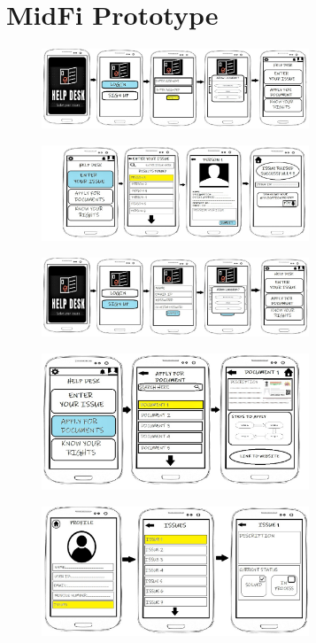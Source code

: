 \documentclass[acmtog]{acmart}
\begin{document}
\section{MidFi Prototype}
\begin{figure}[H]
    \includegraphics[width=8cm]{Prototype/Low-fi/LowFi1.jpeg}
\end{figure}
\begin{figure}[H]
    \includegraphics[width=8cm]{Prototype/Low-fi/LowFi2.jpeg}
\end{figure}
\begin{figure}[H]
    \includegraphics[width=8cm]{Prototype/Low-fi/LowFi3.jpeg}
\end{figure}
\begin{figure}[H]
    \includegraphics[width=8cm]{Prototype/Low-fi/LowFi4.jpeg}
\end{figure}
\begin{figure}[H]
    \includegraphics[width=8cm]{Prototype/Low-fi/LowFi5.jpeg}
\end{figure}
\end{document}
